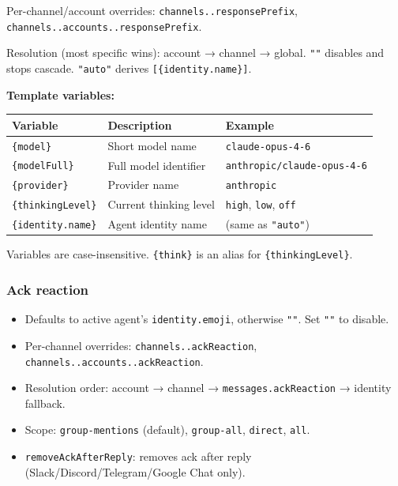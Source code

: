 Per-channel/account overrides: \texttt{channels..responsePrefix}, \texttt{channels..accounts..responsePrefix}.

Resolution (most specific wins): account → channel → global. \texttt{""} disables and stops cascade. \texttt{"auto"} derives \texttt{[\{identity.name\}]}.

\textbf{Template variables:}


\begin{table}[h]
\centering
\small
\begin{tabular}{|l|l|l|}
\hline
Variable & Description & Example \\
\hline
\texttt{\{model\}} & Short model name & \texttt{claude-opus-4-6} \\
\hline
\texttt{\{modelFull\}} & Full model identifier & \texttt{anthropic/claude-opus-4-6} \\
\hline
\texttt{\{provider\}} & Provider name & \texttt{anthropic} \\
\hline
\texttt{\{thinkingLevel\}} & Current thinking level & \texttt{high}, \texttt{low}, \texttt{off} \\
\hline
\texttt{\{identity.name\}} & Agent identity name & (same as \texttt{"auto"}) \\
\hline
\end{tabular}
\end{table}



Variables are case-insensitive. \texttt{\{think\}} is an alias for \texttt{\{thinkingLevel\}}.

\subsubsection{Ack reaction}


\begin{itemize}
  \item Defaults to active agent's \texttt{identity.emoji}, otherwise \texttt{""}. Set \texttt{""} to disable.
  \item Per-channel overrides: \texttt{channels..ackReaction}, \texttt{channels..accounts..ackReaction}.
  \item Resolution order: account → channel → \texttt{messages.ackReaction} → identity fallback.
  \item Scope: \texttt{group-mentions} (default), \texttt{group-all}, \texttt{direct}, \texttt{all}.
  \item \texttt{removeAckAfterReply}: removes ack after reply (Slack/Discord/Telegram/Google Chat only).
\end{itemize}


